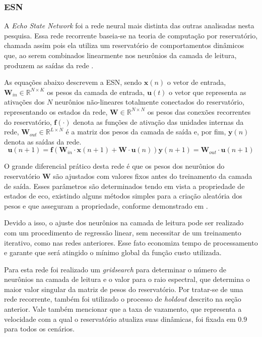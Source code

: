 \documentclass{article}
\begin{document}
\subsubsection{ESN}

A \textit{Echo State Network} foi a rede neural mais distinta das outras analisadas nesta pesquisa. Essa rede recorrente baseia-se na teoria de computação por reservatório, chamada assim pois ela utiliza um reservatório de comportamentos dinâmicos que, ao serem combinados linearmente nos neurônios da camada de leitura, produzem as saídas da rede \cite{boccato2013novas}. 

As equações abaixo descrevem a ESN, sendo $\mathbf{x}(n)$ o vetor de entrada, $\mathbf{W}_{in} \in \mathbb{R}^{N \times K}$ os pesos da camada de entrada, $\mathbf{u}(t)$ o vetor que representa as ativações dos $N$ neurônios não-lineares totalmente conectados do reservatório, representando os estados da rede, $\mathbf{W} \in \mathbb{R}^{N \times N}$ os pesos das conexões recorrentes do reservatório, $\mathbf{f}(\cdot)$ denota as funções de ativação das unidades internas da rede, $\mathbf{W}_{out} \in \mathbb{R}^{L \times N}$ é a matriz dos pesos da camada de saída e, por fim, $\mathbf{y}(n)$ denota as saídas da rede.
\begin{subequations}
\begin{equation}
\mathbf{u}(n+1) = \mathbf{f}(\mathbf{W}_{in} \cdot \mathbf{x}(n+1) + \mathbf{W} \cdot \mathbf{u}(n))
\end{equation}
\begin{equation}
\mathbf{y}(n+1) = \mathbf{W}_{out} \cdot \mathbf{u}(n+1)
\end{equation}
\end{subequations}

O grande diferencial prático desta rede é que os pesos dos neurônios do reservatório $\mathbf{W}$ são ajustados com valores fixos antes do treinamento da camada de saída. Esses parâmetros são determinados tendo em vista a propriedade de estados de eco, existindo alguns métodos simples para a criação aleatória dos pesos e que asseguram a propriedade, conforme demonstrado em \cite{jaeger2007echo}. 

Devido a isso, o ajuste dos neurônios na camada de leitura pode ser realizado com um procedimento de regressão linear, sem necessitar de um treinamento iterativo, como nas redes anteriores. Esse fato economiza tempo de processamento e garante que será atingido o mínimo global da função custo utilizada.

Para esta rede foi realizado um \textit{gridsearch} para determinar o número de neurônios na camada de leitura e o valor para o raio espectral, que determina o maior valor singular da matriz de pesos do reservatório. Por tratar-se de uma rede recorrente, também foi utilizado o processo de \textit{holdout} descrito na seção anterior. Vale também mencionar que a taxa de vazamento, que representa a velocidade com a qual o reservatório atualiza suas dinâmicas, foi fixada em $0.9$ para todos os cenários.
\end{document}
